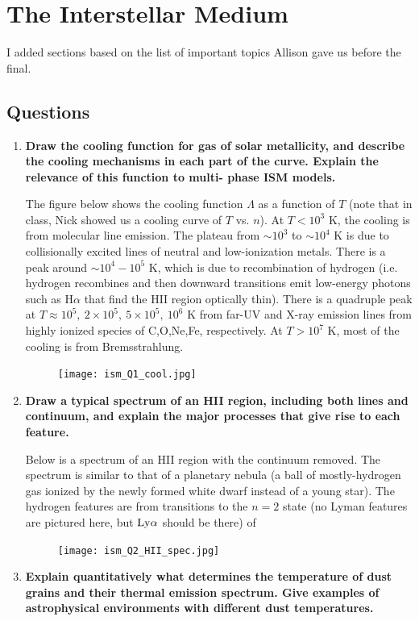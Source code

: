 \section{The Interstellar Medium}

I added sections based on the list of important topics Allison gave us 
before the final. 

\subsection{Questions}
\begin{enumerate}
\item \textbf{Draw the cooling function for gas of solar metallicity, and describe the cooling
      mechanisms in each part of the curve. Explain the relevance of this function to multi-
      phase ISM models.}
      
      The figure below shows the cooling function $\Lambda$ as a function of $T$ (note that in class, Nick showed us a cooling curve of $T$ vs. $n$). At $T < 10^3$ K, the cooling is from molecular line emission. The plateau from $\sim10^3$ to $\sim10^4$ K is due to collisionally excited lines of neutral and low-ionization metals. There is a peak around $\sim10^4-10^5$ K, which is due to recombination of hydrogen (i.e. hydrogen recombines and then downward transitions emit low-energy photons such as H$\alpha$ that find the HII region optically thin). There is a quadruple peak at $T \approx 10^5,~2\times 10^5,~5\times 10^5,~10^6$ K from far-UV and X-ray emission lines from highly ionized species of C,O,Ne,Fe, respectively. At $T > 10^7$ K, most of the cooling is from Bremsstrahlung.
      
            \begin{figure}[!h]
      \begin{center}
      \texttt{[image: ism\_Q1\_cool.jpg]}
      \end{center}
	\end{figure}
      
\item \textbf{Draw a typical spectrum of an HII region, including both lines and continuum, and
      explain the major processes that give rise to each feature.}
      
      Below is a spectrum of an HII region with the continuum removed. The spectrum is similar to that of a planetary nebula (a ball of mostly-hydrogen gas ionized by the newly formed white dwarf instead of a young star). The hydrogen features are from transitions to the $n=2$ state (no Lyman features are pictured here, but ${\rm Ly}\alpha$ should be there) of 
      
      \begin{figure}[!h]
      \begin{center}
      \texttt{[image: ism\_Q2\_HII\_spec.jpg]}
      \end{center}
	\end{figure}
\item \textbf{Explain quantitatively what determines the temperature of dust grains and their
      thermal emission spectrum. Give examples of astrophysical environments with different
      dust temperatures.}
\end{enumerate}

